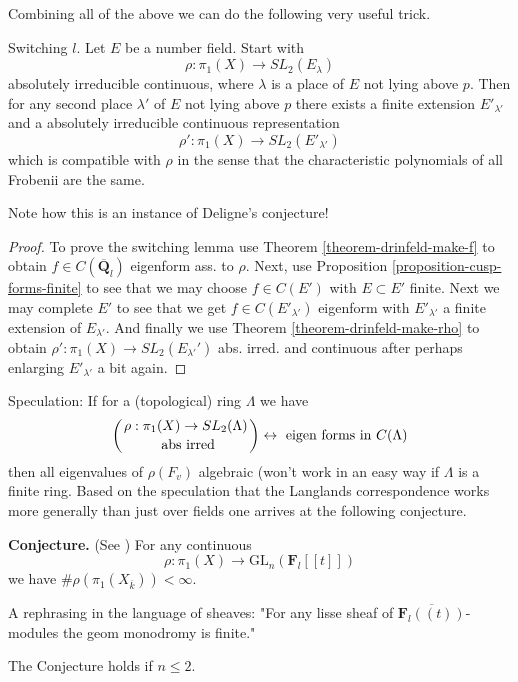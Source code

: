 \noindent
Combining all of the above we can do the following very useful trick.

\begin{lemma}
\label{lemma-switch-l}
Switching $l$. Let $E$ be a number field.
Start with
$$
\rho : \pi_1(X)\to SL_2(E_\lambda)
$$
absolutely irreducible continuous, where $\lambda$ is a place of $E$
not lying above $p$. Then for any second place $\lambda'$ of $E$
not lying above $p$ there exists a finite extension $E'_{\lambda'}$
and a absolutely irreducible continuous representation
$$
\rho': \pi_1(X)\to SL_2(E'_{\lambda'})
$$
which is compatible with $\rho$ in the sense that the characteristic
polynomials of all Frobenii are the same.
\end{lemma}

\noindent
Note how this is an instance of Deligne's conjecture!

\begin{proof}
To prove the switching lemma use
Theorem \ref{theorem-drinfeld-make-f}
to obtain $f\in C(\overline{\mathbf{Q}}_l)$ eigenform ass. to $\rho$.
Next, use
Proposition \ref{proposition-cusp-forms-finite}
to see that we may choose $f\in C(E')$ with $E \subset E'$ finite.
Next we may complete $E'$ to see that we get
$f\in C(E'_{\lambda'})$ eigenform with
$E'_{\lambda'}$ a finite extension of $E_{\lambda'}$.
And finally we use
Theorem \ref{theorem-drinfeld-make-rho}
to obtain
$\rho': \pi_1(X) \to SL_2(E_{\lambda'}')$ abs. irred. and continuous
after perhaps enlarging $E'_{\lambda'}$ a bit again.
\end{proof}

\noindent
Speculation: If for a (topological) ring $\Lambda$ we have
$$
\left(
{\rho : \pi_1(X)\to SL_2(\Lambda) \atop \text{ abs irred}}
\right)
\leftrightarrow
\text{ eigen forms in } C(\Lambda)
$$
then all eigenvalues of $\rho(F_v)$ algebraic (won't work in an easy
way if $\Lambda$ is a finite ring. Based on the speculation that the
Langlands correspondence works more generally than just over fields
one arrives at the following conjecture.

\medskip\noindent
{\bf Conjecture.}
(See \cite{dJ-conjecture})
For any continuous
$$
\rho : \pi_1(X)\to \text{GL}_n(\mathbf{F}_l[[t]])
$$
we have $\# \rho(\pi_1(X_{\overline{k}}))<\infty$.

\medskip\noindent
A rephrasing in the language of sheaves:
"For any lisse sheaf of $\overline{\mathbf{F}_l((t))}$-modules the geom
monodromy is finite."

\begin{theorem}
\label{theorem-conjecture-n-2}
The Conjecture holds if $n\leq 2$.
\end{theorem}

